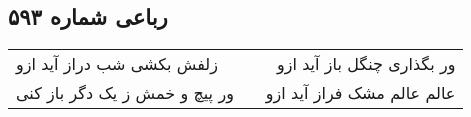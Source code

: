 \begin{center}
\section*{رباعی شماره ۵۹۳}
\label{sec:sh593}
\begin{longtable}{l p{0.5cm} r}
زلفش بکشی شب دراز آید ازو
&&
ور بگذاری چنگل باز آید ازو
\\
ور پیچ و خمش ز یک دگر باز کنی
&&
عالم عالم مشک فراز آید ازو
\\
\end{longtable}
\end{center}
